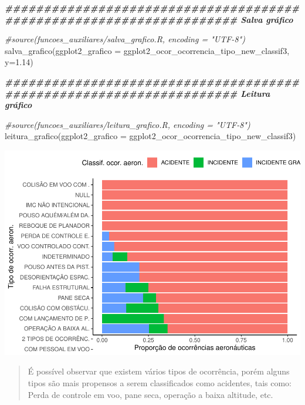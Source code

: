 \documentclass[
]{article}
\newenvironment{Shaded}{\begin{snugshade}}{\end{snugshade}}
\newcommand{\AttributeTok}[1]{\textcolor[rgb]{0.77,0.63,0.00}{#1}}
\newcommand{\CommentTok}[1]{\textcolor[rgb]{0.56,0.35,0.01}{\textit{#1}}}
\newcommand{\DocumentationTok}[1]{\textcolor[rgb]{0.56,0.35,0.01}{\textbf{\textit{#1}}}}
\newcommand{\FloatTok}[1]{\textcolor[rgb]{0.00,0.00,0.81}{#1}}
\newcommand{\FunctionTok}[1]{\textcolor[rgb]{0.00,0.00,0.00}{#1}}
\newcommand{\NormalTok}[1]{#1}
\begin{document}
\begin{Shaded}
\begin{Highlighting}[]
\DocumentationTok{\#\#\#\#\#\#\#\#\#\#\#\#\#\#\#\#\#\#\#\#\#\#\#\#\#\#\#\#\#\#\#\#\#\#\#\#\#\#\#\#\#\#\#\#\#\#\#\#\#\#\#\#\#\#\#\#\#\#\#\#\#\#\#\#\#\#\#\# Salva gráfico}

\CommentTok{\#source(\textquotesingle{}funcoes\_auxiliares/salva\_grafico.R\textquotesingle{}, encoding = "UTF{-}8")}
\FunctionTok{salva\_grafico}\NormalTok{(}\AttributeTok{ggplot2\_grafico =}\NormalTok{ ggplot2\_ocor\_ocorrencia\_tipo\_new\_classif3, }\AttributeTok{y=}\FloatTok{1.14}\NormalTok{)}

\DocumentationTok{\#\#\#\#\#\#\#\#\#\#\#\#\#\#\#\#\#\#\#\#\#\#\#\#\#\#\#\#\#\#\#\#\#\#\#\#\#\#\#\#\#\#\#\#\#\#\#\#\#\#\#\#\#\#\#\#\#\#\#\#\#\#\#\#\#\#\#\# Leitura gráfico}

\CommentTok{\#source(\textquotesingle{}funcoes\_auxiliares/leitura\_grafico.R\textquotesingle{}, encoding = "UTF{-}8")}
\FunctionTok{leitura\_grafico}\NormalTok{(}\AttributeTok{ggplot2\_grafico =}\NormalTok{ ggplot2\_ocor\_ocorrencia\_tipo\_new\_classif3)}
\end{Highlighting}
\end{Shaded}

\begin{center}\includegraphics[width=1\linewidth]{../4.Relatorio/pdf/index_files/figure-latex/unnamed-chunk-50-2} \end{center}

\begin{quote}
É possível observar que existem vários tipos de ocorrência, porém alguns
tipos são mais propensos a serem classificados como acidentes, tais
como: Perda de controle em voo, pane seca, operação a baixa altitude,
etc.
\end{quote}
\end{document}
